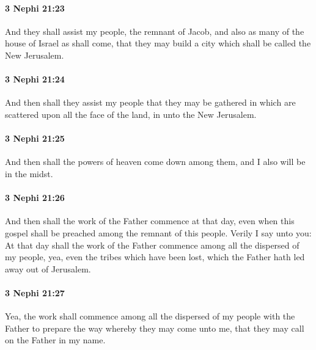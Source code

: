 		\paragraph{3 Nephi 21:23} %
			\label{3NEPHI-21-23}

			And they shall assist my people, the remnant of Jacob,
			and also as many of the house of Israel as shall come,
			that they may build a city which shall be called the New Jerusalem.

		\paragraph{3 Nephi 21:24} %
			\label{3NEPHI-21-24}

			And then shall they assist my people
			that they may be gathered in
			which are scattered upon all the face of the land,
			in unto the New Jerusalem.

		\paragraph{3 Nephi 21:25} %
			\label{3NEPHI-21-25}

			And then shall the powers of heaven come down among them,
			and I also will be in the midst.

		\paragraph{3 Nephi 21:26} %
			\label{3NEPHI-21-26}

			And then shall the work of the Father commence at that day,
			even when this gospel shall be preached among the remnant of this people.
			Verily I say unto you:
			At that day shall the work of the Father commence
			among all the dispersed of my people,
			yea, even the tribes which have been lost,
			which the Father hath led away out of Jerusalem.

		\paragraph{3 Nephi 21:27} %
			\label{3NEPHI-21-27}

			Yea, the work shall commence
			among all the dispersed of my people
			with the Father to prepare the way
			whereby they may come unto me,
			that they may call on the Father in my name.

